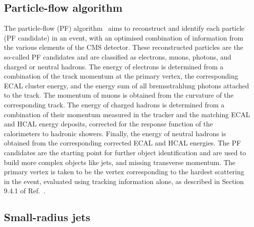 \subsection{Particle-flow algorithm}

The particle-flow (PF) algorithm~\cite{PRF-14-001} aims to reconstruct and identify each particle (PF candidate) in an event, with an optimised combination of information from the various elements of the CMS detector. These reconstructed particles are the so-called PF candidates and are classified as electrons, muons, photons, and charged or neutral hadrons.
The energy of electrons is determined from a combination of the track momentum at the primary vertex, the corresponding ECAL cluster energy, and the energy sum of all bremsstrahlung photons attached to the track. The momentum of muons is obtained from the curvature of the corresponding track. The energy of charged hadrons is determined from a combination of their momentum measured in the tracker and the matching ECAL and HCAL energy deposits, corrected for the response function of the calorimeters to hadronic showers. Finally, the energy of neutral hadrons is obtained from the corresponding corrected ECAL and HCAL energies.
The PF candidates are the starting point for further object identification and are used to build more complex objects like jets, and missing transverse momentum. The primary vertex is taken to be the vertex corresponding to the hardest scattering in the event, evaluated using tracking information alone, as described in Section 9.4.1 of Ref.~\cite{CMS-TDR-15-02}.



\subsection{Small-radius jets}
\label{sec:ak4jets}


